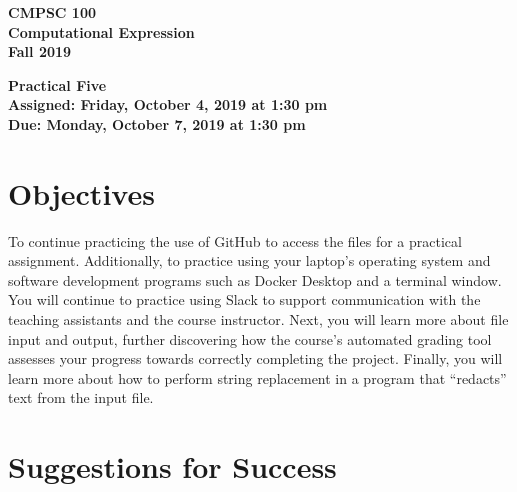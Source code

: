 \documentclass[11pt]{article}
\newcommand{\assignmentduedate}{October 7}
\newcommand{\assignmentassignedate}{October 4}
\newcommand{\assignmentnumber}{Five}
\newcommand{\labyear}{2019}
\newcommand{\labdueday}{Monday}
\newcommand{\labassignday}{Friday}
\newcommand{\labtime}{1:30 pm}
\newcommand{\assigneddate}{Assigned: \labassignday, \assignmentassignedate, \labyear{} at \labtime{}}
\newcommand{\duedate}{Due: \labdueday, \assignmentduedate, \labyear{} at \labtime{}}
\newcommand{\labtitle}[1]
{
  \begin{center}
    \begin{center}
      \bf
      CMPSC 100\\Computational Expression\\
      Fall 2019\\
      \medskip
    \end{center}
    \bf
    #1
  \end{center}
}
\begin{document}
\thispagestyle{empty}

\labtitle{Practical \assignmentnumber{} \\ \assigneddate{} \\ \duedate{}}

\section*{Objectives}

To continue practicing the use of GitHub to access the files for a practical
assignment. Additionally, to practice using your laptop's operating system and
software development programs such as Docker Desktop and a terminal window. You
will continue to practice using Slack to support communication with the teaching
assistants and the course instructor. Next, you will learn more about file input
and output, further discovering how the course's automated grading tool assesses
your progress towards correctly completing the project. Finally, you will learn
more about how to perform string replacement in a program that ``redacts'' text
from the input file.

\section*{Suggestions for Success}
\end{document}
